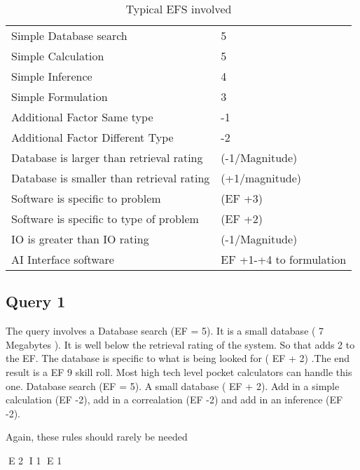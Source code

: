 \begin{table}[htb]
\caption{Typical EFS involved}
	\begin{tabular}{||l|l||} \hline
	Simple Database search      & 5 \\
	Simple Calculation          & 5 \\
	Simple Inference            & 4 \\
	Simple Formulation          & 3 \\ \hline

	Additional Factor Same type & -1 \\
	Additional Factor Different Type & -2 \\
	Database is larger than retrieval rating  & (-1/Magnitude) \\
	Database is smaller than retrieval rating & (+1/magnitude) \\
	Software is specific to problem           & (EF +3) \\
	Software is specific to type of problem   & (EF +2) \\
	IO is greater than IO rating              & (-1/Magnitude) \\ \hline

	AI Interface software                     & EF +1-+4 to formulation \\ \hline
	\end{tabular}
\end{table}

\subsection{Query 1}
The query involves a Database search (EF = 5). It is a small
database ( 7 Megabytes ). It is well below the retrieval rating of
the system. So that adds 2 to the EF. The database is specific to
what is being looked for ( EF + 2) .The end result is a EF 9 skill
roll. Most high tech level pocket calculators can handle this one.
Database search (EF = 5). A small database ( EF + 2). Add in a
simple calculation (EF -2), add in a correalation (EF -2) and add in
an inference (EF -2).

Again, these rules should rarely be needed


E 2
I 1
E 1
